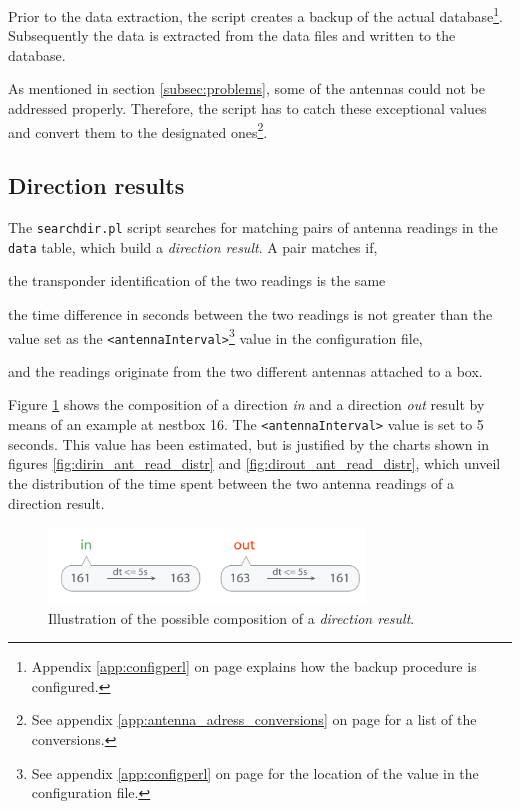Prior to the data extraction, the  script creates a backup of the actual database\footnote{Appendix \ref{app:configperl} on page \pageref{app:configperl} explains how the backup procedure is configured.}. Subsequently the data is extracted from the data files and written to the database. 

As mentioned in section \ref{subsec:problems}, some of the antennas could not be addressed properly. Therefore, the script has to catch these exceptional values and convert them to the designated ones\footnote{See appendix \ref{app:antenna_adress_conversions} on page \pageref{app:antenna_adress_conversions} for a list of the conversions.}.  

\subsection{Direction results}
\label{subsec:dirres}

The \lstinline|searchdir.pl| script searches for matching pairs of antenna readings in the \lstinline|data| table, which build a \textit{direction result}. A pair matches if,

\begin{mylist}
\item the transponder identification of the two readings is the same
\item the time difference in seconds between the two readings is not greater than the value set as the \lstinline|<antennaInterval>|\footnote{See appendix \ref{app:configperl} on page \pageref{app:configperl} for the location of the value in the configuration file.} value in the configuration file, 
\item and the readings originate from the two different antennas attached to a box.  
\end{mylist}

Figure \ref{fig:direction_result} shows the composition of a direction \textit{in} and a direction \textit{out} result by means of an example at nestbox 16. The \lstinline|<antennaInterval>| value is set to 5 seconds. This value has been estimated, but is justified by the charts shown in figures \ref{fig:dirin_ant_read_distr} and \ref{fig:dirout_ant_read_distr}, which unveil the distribution of the time spent between the two antenna readings of a direction result.

\begin{figure}[htpb]
\begin{center}
  \includegraphics[width=0.75\textwidth]{assets/pdf/direction_result_schema.pdf}
  \caption[Illustration of a direction result]{Illustration of the possible composition of a \textit{direction result}.}
  \label{fig:direction_result}
\end{center}
\end{figure}

